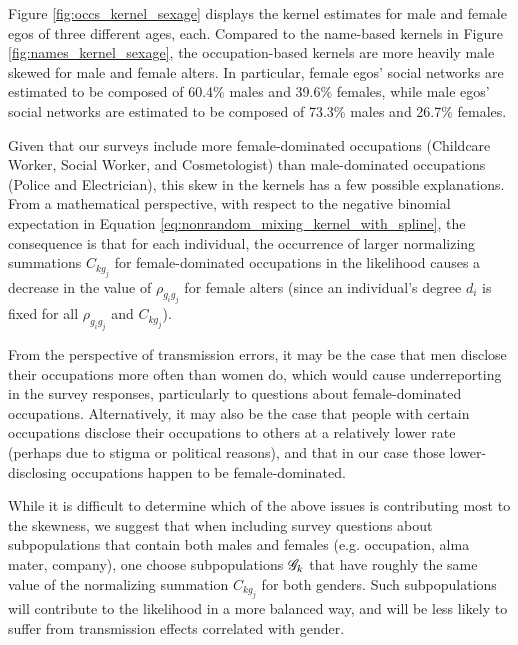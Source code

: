 Figure \ref{fig:occs_kernel_sexage} displays the kernel estimates for male and female egos of three different ages, each. Compared to the name-based kernels in Figure \ref{fig:names_kernel_sexage}, the occupation-based kernels are more heavily male skewed for male and female alters. In particular, female egos' social networks are estimated to be composed of 60.4\% males and 39.6\% females, while male egos' social networks are estimated to be composed of 73.3\% males and 26.7\% females. 

Given that our surveys include more female-dominated occupations (Childcare Worker, Social Worker, and Cosmetologist) than male-dominated occupations (Police and Electrician), this skew in the kernels has a few possible explanations. From a mathematical perspective, with respect to the negative binomial expectation in Equation \ref{eq:nonrandom_mixing_kernel_with_spline}, the consequence is that for each individual, the occurrence of larger normalizing summations $C_{kg_j}$ for female-dominated occupations in the likelihood causes a decrease in the value of $\rho_{g_ig_j}$ for female alters (since an individual's degree $d_i$ is fixed for all $\rho_{g_ig_j}$ and $C_{kg_j}$). 

From the perspective of transmission errors, it may be the case that men disclose their occupations more often than women do, which would cause underreporting in the survey responses, particularly to questions about female-dominated occupations. Alternatively, it may also be the case that people with certain occupations disclose their occupations to others at a relatively lower rate (perhaps due to stigma or political reasons), and that in our case those lower-disclosing occupations happen to be female-dominated.

While it is difficult to determine which of the above issues is contributing most to the skewness, we suggest that when including survey questions about subpopulations that contain both males and females (e.g. occupation, alma mater, company), one choose subpopulations $\mathcal{G}_k$ that have roughly the same value of the normalizing summation $C_{kg_j}$ for both genders. Such subpopulations will contribute to the likelihood in a more balanced way, and will be less likely to suffer from transmission effects correlated with gender.

